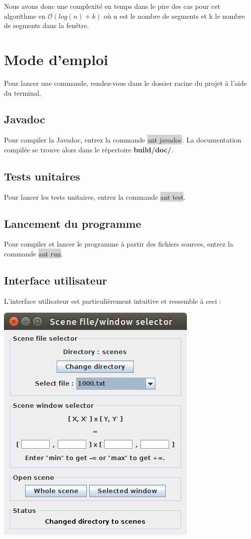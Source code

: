 \documentclass[10pt,a4paper]{article}
\begin{document}
Nous avons donc une complexité en temps dans le pire des cas pour cet algorithme en $\mathcal{O}(log(n)+k)$ où n est le nombre de segments et k le nombre de segments dans la fenêtre.


\newpage
\section{Mode d'emploi}
Pour lancer une commande, rendez-vous dans le dossier racine du projet à l'aide du terminal.

\subsection{Javadoc}
Pour compiler la Javadoc, entrez la commande \colorbox{lightgray}{ant javadoc}. La documentation compilée se trouve alors dans le répertoire \textbf{build/doc/}.

\subsection{Tests unitaires}
Pour lancer les tests unitaires, entrez la commande \colorbox{lightgray}{ant test}.

\subsection{Lancement du programme}
Pour compiler et lancer le programme à partir des fichiers sources, entrez la commande \colorbox{lightgray}{ant run}.

\subsection{Interface utilisateur}
L'interface utilisateur est particulièrement intuitive et ressemble à ceci :

\centerline{\includegraphics[scale=0.5]{images/ui.png}}
\end{document}
